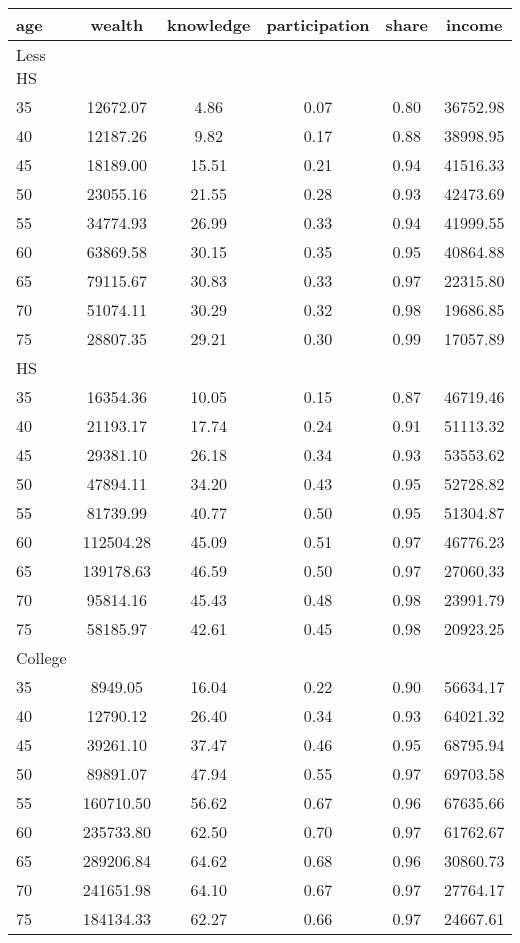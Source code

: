  \begin{tabular}{lccccc}
 \hline \hline
  age & wealth & knowledge & participation & share & income \\
 \hline
 Less HS & & & & & \\
 \hline
35 &  12672.07 &      4.86 &      0.07 &      0.80 &  36752.98 \\ 
40 &  12187.26 &      9.82 &      0.17 &      0.88 &  38998.95 \\ 
45 &  18189.00 &     15.51 &      0.21 &      0.94 &  41516.33 \\ 
50 &  23055.16 &     21.55 &      0.28 &      0.93 &  42473.69 \\ 
55 &  34774.93 &     26.99 &      0.33 &      0.94 &  41999.55 \\ 
60 &  63869.58 &     30.15 &      0.35 &      0.95 &  40864.88 \\ 
65 &  79115.67 &     30.83 &      0.33 &      0.97 &  22315.80 \\ 
70 &  51074.11 &     30.29 &      0.32 &      0.98 &  19686.85 \\ 
75 &  28807.35 &     29.21 &      0.30 &      0.99 &  17057.89 \\ 
 \hline
 HS & & & & & \\
 \hline
35 &  16354.36 &     10.05 &      0.15 &      0.87 &  46719.46 \\ 
40 &  21193.17 &     17.74 &      0.24 &      0.91 &  51113.32 \\ 
45 &  29381.10 &     26.18 &      0.34 &      0.93 &  53553.62 \\ 
50 &  47894.11 &     34.20 &      0.43 &      0.95 &  52728.82 \\ 
55 &  81739.99 &     40.77 &      0.50 &      0.95 &  51304.87 \\ 
60 & 112504.28 &     45.09 &      0.51 &      0.97 &  46776.23 \\ 
65 & 139178.63 &     46.59 &      0.50 &      0.97 &  27060.33 \\ 
70 &  95814.16 &     45.43 &      0.48 &      0.98 &  23991.79 \\ 
75 &  58185.97 &     42.61 &      0.45 &      0.98 &  20923.25 \\ 
 \hline
 College & & & & & \\
 \hline
35 &   8949.05 &     16.04 &      0.22 &      0.90 &  56634.17 \\ 
40 &  12790.12 &     26.40 &      0.34 &      0.93 &  64021.32 \\ 
45 &  39261.10 &     37.47 &      0.46 &      0.95 &  68795.94 \\ 
50 &  89891.07 &     47.94 &      0.55 &      0.97 &  69703.58 \\ 
55 & 160710.50 &     56.62 &      0.67 &      0.96 &  67635.66 \\ 
60 & 235733.80 &     62.50 &      0.70 &      0.97 &  61762.67 \\ 
65 & 289206.84 &     64.62 &      0.68 &      0.96 &  30860.73 \\ 
70 & 241651.98 &     64.10 &      0.67 &      0.97 &  27764.17 \\ 
75 & 184134.33 &     62.27 &      0.66 &      0.97 &  24667.61 \\ 
 \hline \hline
 \end{tabular}
